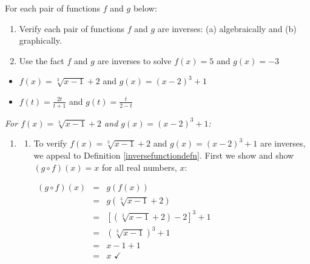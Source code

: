 \documentclass{ximera}
\begin{document}


\begin{example}  \label{inverseverifyex}  For each pair of functions $f$ and $g$ below:

\begin{enumerate}

\item  Verify each pair of functions $f$ and $g$ are inverses:  (a) algebraically and (b) graphically.

\item  Use the fact $f$ and $g$ are inverses to solve $f(x) = 5$ and $g(x) = -3$

\end{enumerate}

\begin{itemize}

\item  $f(x) = \sqrt[3]{x-1} + 2$ and $g(x) = (x-2)^3+1$ 

\item  $f(t) = \frac{2t}{t+1}$ and $g(t) = \frac{t}{2-t}$

\end{itemize}

\begin{explanation}

\textit{For $f(x) = \sqrt[3]{x-1} + 2$ and $g(x) = (x-2)^3+1$:}

\begin{enumerate}

\item  \begin{enumerate} \item To verify  $f(x) = \sqrt[3]{x-1} + 2$ and $g(x) = (x-2)^3+1$  are inverses, we appeal to Definition \ref{inversefunctiondefn}.  First we show and show $(g \circ f)(x) = x$ for all real numbers, $x$:   


$\begin{array}{rcl}

(g \circ f)(x) & = & g(f(x))  \\
                   & = & g(\sqrt[3]{x-1} + 2)  \\
                   & = & [ (\sqrt[3]{x-1} + 2)-2]^3 + 1  \\
                   & = & (\sqrt[3]{x-1})^3 + 1  \\
                   & = & x-1+1 \\ 
                   & = & x \, \, \checkmark  \\
\end{array}$


\end{enumerate}
\end{enumerate}
\end{explanation}
\end{example}
\end{document}
